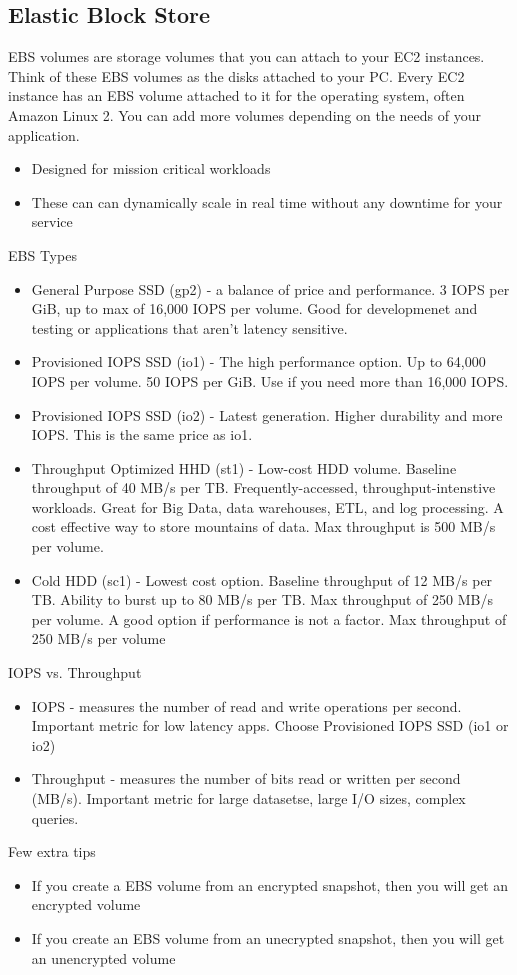 \documentclass{article}%
\begin{document}
\subsection{Elastic Block Store}
EBS volumes are storage volumes that you can attach to your EC2 instances. Think of these EBS volumes as the disks attached to your PC. Every EC2 instance has an EBS volume attached to it for the operating system, often Amazon Linux 2. 
You can add more volumes depending on the needs of your application.
\begin{itemize}
    \item Designed for mission critical workloads
    \item These can can dynamically scale in real time without any downtime for your service
\end{itemize}
EBS Types
\begin{itemize}
    \item General Purpose SSD (gp2) - a balance of price and performance. 3 IOPS per GiB, up to max of 16,000 IOPS per volume. Good for developmenet and testing or applications that aren't latency sensitive.
    \item Provisioned IOPS SSD (io1) - The high performance option. Up to 64,000 IOPS per volume. 50 IOPS per GiB. Use if you need more than 16,000 IOPS. 
    \item Provisioned IOPS SSD (io2) - Latest generation. Higher durability and more IOPS. This is the same price as io1.
    \item Throughput Optimized HHD (st1) - Low-cost HDD volume. Baseline throughput of 40 MB/s per TB. Frequently-accessed, throughput-intenstive workloads. Great for Big Data, data warehouses, ETL, and log processing. A cost effective way to store mountains of data. Max throughput is 500 MB/s per volume.
    \item Cold HDD (sc1) - Lowest cost option. Baseline throughput of 12 MB/s per TB. Ability to burst up to 80 MB/s per TB. Max throughput of 250 MB/s per volume. A good option if performance is not a factor. Max throughput of 250 MB/s per volume
\end{itemize}    
IOPS vs. Throughput
\begin{itemize}
    \item IOPS - measures the number of read and write operations per second. Important metric for low latency apps. Choose Provisioned IOPS SSD (io1 or io2)
    \item Throughput - measures the number of bits read or written per second (MB/s). Important metric for large datasetse, large I/O sizes, complex queries.
\end{itemize}
Few extra tips
\begin{itemize}
    \item If you create a EBS volume from an encrypted snapshot, then you will get an encrypted volume
    \item If you create an EBS volume from an unecrypted snapshot, then you will get an unencrypted volume
\end{itemize}
\end{document}
